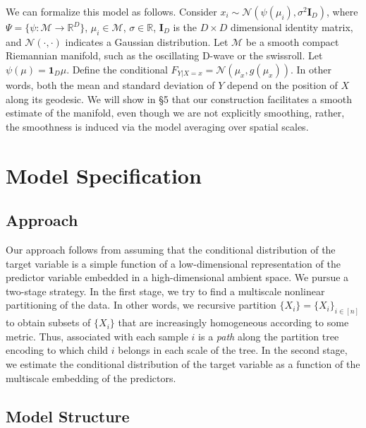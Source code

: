 \documentclass{article}
\newcommand{\Real}{\mathbb{R}}
\providecommand{\mb}[1]{\boldsymbol{#1}}
\providecommand{\mc}[1]{\mathcal{#1}}
\newcommand{\from}{{\ensuremath{\colon}}}           %
\newcommand{\jovo}[1]{{\color{magenta}{\it JoVo says: #1}}}
\begin{document}
We can formalize this model as follows. Consider $x_i \sim \mc{N}(\psi(\mu_i),\sigma^2 \mb{I}_D)$, where $\Psi =\{ \psi \from \mc{M} \to \Real^D\}$, $\mu_i \in \mc{M}$, $\sigma \in \Real$, $\mb{I}_D$ is the $D\times D$ dimensional identity matrix, and $\mc{N}(\cdot,\cdot)$ indicates a Gaussian distribution.  Let $\mc{M}$ be a smooth compact Riemannian manifold, such as the oscillating D-wave or the swissroll.  Let $\psi(\mu)=\mb{1}_D \mu$. Define the conditional $F_{Y|X=x} = \mc{N}( \mu_x, g(\mu_x))$. In other words, both the mean and standard deviation of $Y$ depend on the position of $X$ along its geodesic. We will show in \S 5 that  our construction facilitates a smooth estimate of the manifold, even though we are not explicitly smoothing, rather, the smoothness is induced via the  model averaging over spatial scales.

\section{Model Specification} %
\label{sec:approach}
\subsection{Approach}


Our approach follows from assuming that the conditional distribution of the target variable is a simple function of a low-dimensional representation of the predictor variable embedded in a high-dimensional ambient space.  We pursue a two-stage strategy.  In the first stage, we try to find a multiscale nonlinear partitioning of the data.  In other words, we recursive partition $\{X_i\}=\{X_i\}_{i \in [n]}$ to obtain subsets of $\{X_i\}$ that are increasingly homogeneous according to some metric.  Thus, associated with each sample $i$ is a \emph{path} along the partition tree encoding to which child $i$ belongs in each scale of the tree.  In the second stage, we estimate the conditional distribution of the target variable as a function of the multiscale embedding of the predictors.


\subsection{ Model Structure} 

\end{document}
